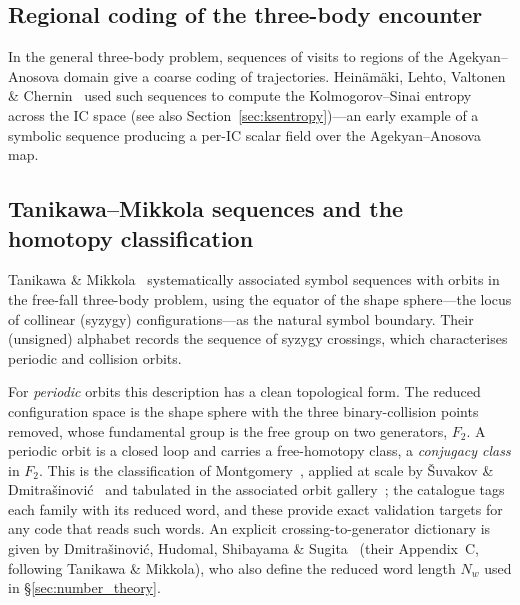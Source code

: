 \documentclass[11pt,a4paper]{article}
\begin{document}
\subsection{Regional coding of the three-body encounter}

In the general three-body problem, sequences of visits to regions of the Agekyan--Anosova domain
give a coarse coding of trajectories.  Heinäm\"{a}ki, Lehto, Valtonen \&
Chernin~\cite{chernin2000} used such sequences to compute the Kolmogorov--Sinai entropy across
the IC space (see also Section~\ref{sec:ksentropy})---an early example of a symbolic sequence
producing a per-IC scalar field over the Agekyan--Anosova map.

\subsection{Tanikawa--Mikkola sequences and the homotopy classification}

Tanikawa \& Mikkola~\cite{tanikawa2015,tanikawa2000} systematically associated symbol sequences
with orbits in the free-fall three-body problem, using the equator of the shape sphere---the
locus of collinear (syzygy) configurations---as the natural symbol boundary.  Their (unsigned)
alphabet records the sequence of syzygy crossings, which characterises periodic and collision
orbits.

For \emph{periodic} orbits this description has a clean topological form.  The reduced
configuration space is the shape sphere with the three binary-collision points removed, whose
fundamental group is the free group on two generators, $F_2$.  A periodic orbit is a closed loop
and carries a free-homotopy class, a \emph{conjugacy class} in $F_2$.  This is the classification
of Montgomery~\cite{montgomery2015,montgomery1998}, applied at scale by \v{S}uvakov \&
Dmitra\v{s}inovi\'{c}~\cite{suvakov2013,suvakov2014} and tabulated in the associated orbit
gallery~\cite{threebodygallery}; the catalogue tags each family with its reduced word, and these
provide exact validation targets for any code that reads such words.  An explicit
crossing-to-generator dictionary is given by Dmitra\v{s}inovi\'{c}, Hudomal, Shibayama \&
Sugita~\cite{dmitrasinovic2018} (their Appendix~C, following Tanikawa \& Mikkola), who also
define the reduced word length $N_w$ used in \S\ref{sec:number_theory}.
\end{document}
